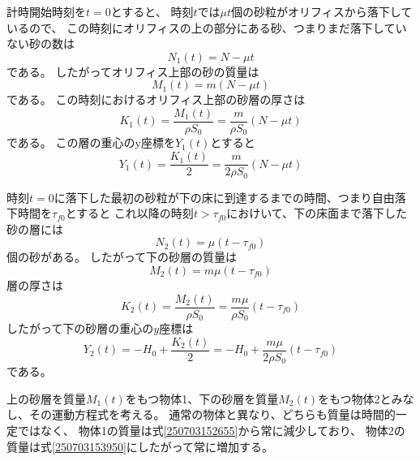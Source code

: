 \documentclass[]{article}
\begin{document}
計時開始時刻を$t=0$とすると、
時刻$t$では$\mu t$個の砂粒がオリフィスから落下しているので、
この時刻にオリフィスの上の部分にある砂、つまりまだ落下していない砂の数は
\begin{equation} \label{250703152453} 
   N_1(t) =  N - \mu t
\end{equation}
である。
したがってオリフィス上部の砂の質量は
\begin{equation} \label{250703152655} 
   M_1(t) = m (N-\mu t)
\end{equation}
である。
この時刻におけるオリフィス上部の砂層の厚さは
\begin{equation} \label{250703152748} 
   K_1(t) = \frac{M_1(t)}{\rho S_0} = \frac{m}{\rho S_0}(N-\mu t)
\end{equation}
である。
この層の重心のy座標を$Y_1(t)$とすると
\begin{equation} \label{250703153013} 
   Y_1(t) = \frac{K_1(t)}{2} = \frac{m}{2\rho S_0} ( N - \mu t)
\end{equation}


時刻$t=0$に落下した最初の砂粒が下の床に到達するまでの時間、つまり自由落下時間を$\tau_{f0}$とすると
これ以降の時刻$t>\tau_{f0}$におけいて、下の床面まで落下した砂の層には
\begin{equation} \label{250703153525} 
   N_2(t) = \mu ( t - \tau_{f0})
\end{equation}
個の砂がある。
したがって下の砂層の質量は
\begin{equation} \label{250703153950} 
   M_2(t) = m\mu(t-\tau_{f0})
\end{equation}
層の厚さは
\begin{equation} \label{250703154021} 
   K_2(t) = \frac{M_2(t)}{\rho S_0} = \frac{m\mu}{\rho S_0} (t-\tau_{f0})
\end{equation}
したがって下の砂層の重心の$y$座標は
\begin{equation} \label{250703154424} 
   Y_2(t) = -H_0 + \frac{K_2(t)}{2} = -H_0 + \frac{m\mu}{2\rho S_0} (t-\tau_{f0})
\end{equation}
である。


上の砂層を質量$M_1(t)$をもつ物体1、下の砂層を質量$M_2(t)$をもつ物体2とみなし、その運動方程式を考える。
通常の物体と異なり、どちらも質量は時間的一定ではなく、
物体1の質量は式\eqref{250703152655}から常に減少しており、
物体2の質量は式\eqref{250703153950}にしたがって常に増加する。
\end{document}
